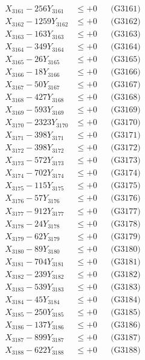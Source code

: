 \documentclass[a4paper,10pt]{article}
\begin{document}
{\begin{align}
\allowbreak
X_{3161} - 256Y_{3161} &\leq +0 && \text{(G3161)} \\
X_{3162} - 1259Y_{3162} &\leq +0 && \text{(G3162)} \\
X_{3163} - 163Y_{3163} &\leq +0 && \text{(G3163)} \\
X_{3164} - 349Y_{3164} &\leq +0 && \text{(G3164)} \\
X_{3165} - 26Y_{3165} &\leq +0 && \text{(G3165)} \\
X_{3166} - 18Y_{3166} &\leq +0 && \text{(G3166)} \\
X_{3167} - 50Y_{3167} &\leq +0 && \text{(G3167)} \\
X_{3168} - 427Y_{3168} &\leq +0 && \text{(G3168)} \\
X_{3169} - 593Y_{3169} &\leq +0 && \text{(G3169)} \\
X_{3170} - 2323Y_{3170} &\leq +0 && \text{(G3170)} \\
\allowbreak
X_{3171} - 398Y_{3171} &\leq +0 && \text{(G3171)} \\
X_{3172} - 398Y_{3172} &\leq +0 && \text{(G3172)} \\
X_{3173} - 572Y_{3173} &\leq +0 && \text{(G3173)} \\
X_{3174} - 702Y_{3174} &\leq +0 && \text{(G3174)} \\
X_{3175} - 115Y_{3175} &\leq +0 && \text{(G3175)} \\
X_{3176} - 57Y_{3176} &\leq +0 && \text{(G3176)} \\
X_{3177} - 912Y_{3177} &\leq +0 && \text{(G3177)} \\
X_{3178} - 24Y_{3178} &\leq +0 && \text{(G3178)} \\
X_{3179} - 62Y_{3179} &\leq +0 && \text{(G3179)} \\
X_{3180} - 89Y_{3180} &\leq +0 && \text{(G3180)} \\
\allowbreak
X_{3181} - 704Y_{3181} &\leq +0 && \text{(G3181)} \\
X_{3182} - 239Y_{3182} &\leq +0 && \text{(G3182)} \\
X_{3183} - 539Y_{3183} &\leq +0 && \text{(G3183)} \\
X_{3184} - 45Y_{3184} &\leq +0 && \text{(G3184)} \\
X_{3185} - 250Y_{3185} &\leq +0 && \text{(G3185)} \\
X_{3186} - 137Y_{3186} &\leq +0 && \text{(G3186)} \\
X_{3187} - 899Y_{3187} &\leq +0 && \text{(G3187)} \\
X_{3188} - 622Y_{3188} &\leq +0 && \text{(G3188)} \\

\end{align}}
\end{document}
